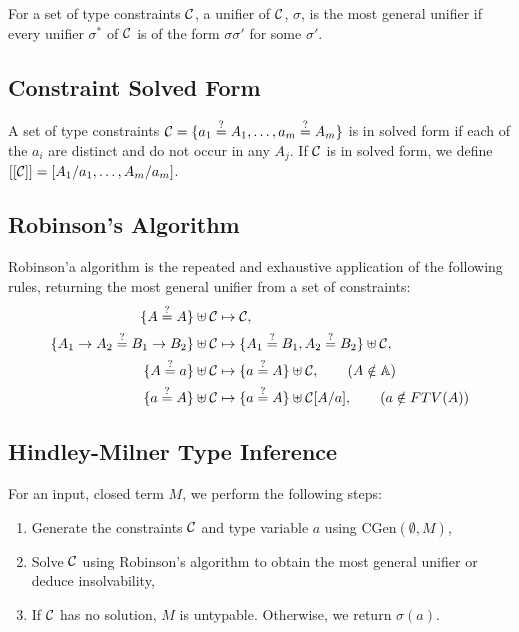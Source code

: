 For a set of type constraints $\mathcal{C}$, a unifier of $\mathcal{C}$, $\sigma$, 
is the most general unifier if every unifier $\sigma^*$ of $\mathcal{C}$ is 
of the form $\sigma\sigma'$ for some $\sigma'$.

\subsection{Constraint Solved Form}

A set of type constraints $\mc{C} = \{a_1 \teq A_1, \ldots, a_m \teq A_m\}$
is in solved form if each of the $a_i$ are distinct and do not occur
in any $A_j$. If $\mathcal{C}$ is in solved form, we define 
$[[\mathcal{C}]] = [A_1/a_1, \ldots, A_m/a_m]$.

\subsection{Robinson's Algorithm}

Robinson'a algorithm is the repeated and exhaustive application of the 
following rules, returning the most general unifier from
a set of constraints: \begin{align*}
    \{A \teq A\} \uplus \mc{C} 
    &\mapsto \mc{C}, 
    \\
    \{A_1 \to A_2 \teq B_1 \to B_2\} \uplus \mc{C} 
    &\mapsto \{A_1 \teq B_1, A_2 \teq B_2\} \uplus \mc{C}, 
    \\
    \{A \teq a\} \uplus \mc{C} 
    &\mapsto \{a \teq A\} \uplus \mc{C}, \tag{$A \notin \mb{A}$} 
    \\
    \{a \teq A\} \uplus \mc{C} 
    &\mapsto \{a \teq A\} \uplus \mc{C}[A / a], \tag{$a \notin FTV(A)$} 
\end{align*}

\subsection{Hindley-Milner Type Inference}

For an input, closed term $M$, we perform the following steps: \begin{enumerate}
    \item Generate the constraints $\mathcal{C}$ and type variable $a$ using
        CGen$(\emptyset, M)$,
    \item Solve $\mathcal{C}$ using Robinson's algorithm to obtain the most general
        unifier or deduce insolvability,
    \item If $\mathcal{C}$ has no solution, $M$ is untypable. Otherwise, we
        return $\sigma(a)$.
\end{enumerate}

